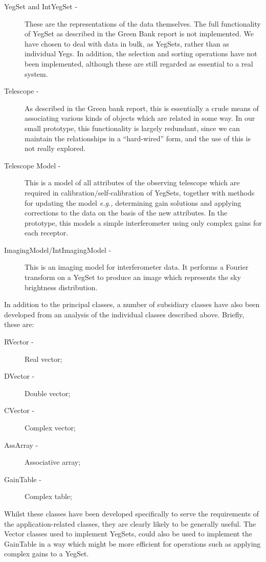 \begin{description}

  \item[YegSet and IntYegSet -] These are the representations of the
       data themselves.  The full functionality of YegSet as described in the
       Green Bank report is not implemented.  We have chosen to deal with
       data in bulk, as YegSets, rather than as individual Yegs.  In
       addition, the selection and sorting operations have not been
       implemented, although these are still regarded as essential to a real
       system.

  \item[Telescope -] As described in the Green bank report, this is essentially
       a crude means of associating various kinds of objects which are
       related in some way.  In our small prototype, this functionality
       is largely redundant, since we can maintain the relationships 
       in a ``hard-wired'' form, and the use of this is not really explored.

  \item[Telescope Model -] This is a model of all attributes of the
       observing telescope which are required in calibration/self-calibration
       of YegSets, together with methods for updating the model
       {\it e.g., } determining gain solutions and applying corrections
       to the data on the basis of the new attributes.
       In the prototype, this models a simple interferometer using
       only complex gains for each receptor.

       
  \item[ImagingModel/IntImagingModel -] This is an imaging model for 
       interferometer data.  It performs a Fourier transform 
       on a YegSet to produce an image which represents the
       sky brightness distribution.

\end{description}

In addition to the principal classes, a number of subsidiary classes
have also been developed from an analysis of the individual classes
described above.  Briefly, these are:

\begin{description}

  \item[RVector -] Real vector;

  \item[DVector -] Double vector;

  \item[CVector -] Complex vector;

  \item[AssArray -] Associative array;

  \item[GainTable -] Complex table;

\end{description}
Whilst these classes have been developed specifically to serve the
requirements of the application-related classes, they are clearly
likely to be generally useful.  The Vector classes used to implement
YegSets, could also be used to implement the GainTable in a way which
might be more efficient for operations such as applying complex gains
to a YegSet.


